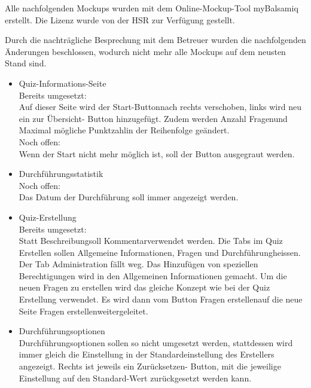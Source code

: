 
Alle nachfolgenden Mockups wurden mit dem Online-Mockup-Tool myBalsamiq \cite{mybalsamiq} erstellt. Die Lizenz wurde von der HSR zur Verfügung gestellt.

Durch die nachträgliche Besprechung mit dem Betreuer wurden die nachfolgenden  Änderungen beschlossen, wodurch nicht mehr alle Mockups auf dem neusten Stand sind.
\begin{itemize}
	\item Quiz-Informations-Seite\\
	Bereits umgesetzt:\\
	Auf dieser Seite wird der \glqq Start-Button\grqq nach rechts verschoben, links wird neu ein \glqq zur Übersicht\grqq - Button hinzugefügt. Zudem werden \glqq Anzahl Fragen\grqq und \glqq Maximal mögliche Punktzahl\grqq in der Reihenfolge geändert.\\
	Noch offen:\\
	Wenn der Start nicht mehr möglich ist, soll der Button ausgegraut werden.
	
	\item Durchführungsstatistik\\
	Noch offen:\\
	Das Datum der Durchführung soll immer angezeigt werden.
	
	\item Quiz-Erstellung\\
	Bereits umgesetzt:\\
	Statt \glqq Beschreibung\grqq soll \glqq Kommentar\grqq verwendet werden. Die Tabs im Quiz Erstellen sollen \glqq Allgemeine Informationen, Fragen und Durchführung\grqq heissen. Der Tab Administration fällt weg. Das Hinzufügen von speziellen Berechtigungen wird in den Allgemeinen Informationen gemacht. Um die neuen Fragen zu erstellen wird das gleiche Konzept wie bei der Quiz Erstellung verwendet. Es wird dann vom Button \glqq Fragen erstellen\grqq auf die neue Seite \glqq Fragen erstellen\grqq weitergeleitet.
	
	\item Durchführungsoptionen\\
	Durchführungsoptionen sollen so nicht umgesetzt werden, stattdessen wird immer gleich die Einstellung in der Standardeinstellung des Erstellers angezeigt. Rechts ist jeweils ein \glqq Zurücksetzen\grqq - Button, mit die jeweilige Einstellung auf den Standard-Wert zurückgesetzt werden kann.
	
\end{itemize}